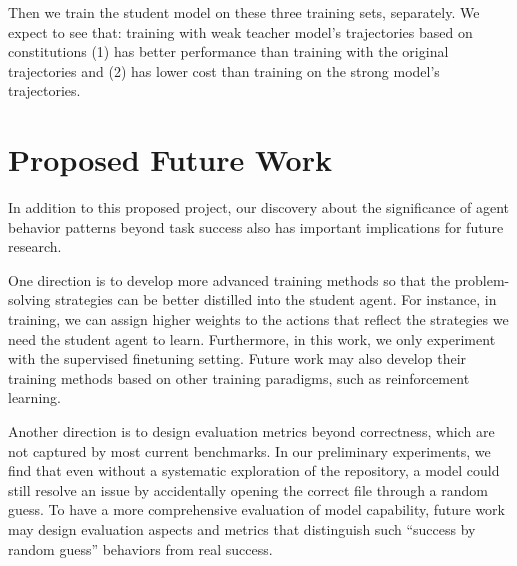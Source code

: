 Then we train the student model on these three training sets, separately. We expect to see that: training with weak teacher model's trajectories based on \plusname constitutions 
(1) has better performance than training with the original trajectories and 
(2) has lower cost than training on the strong model's trajectories.


\section{Proposed Future Work}
In addition to this proposed project, our discovery about the significance of agent behavior patterns beyond task success also has important implications for future research.

One direction is to develop more advanced training methods so that the problem-solving strategies can be better distilled into the student agent.
For instance, in training, we can assign higher weights to the actions that reflect the strategies we need the student agent to learn.
Furthermore, in this work, we only experiment with the supervised finetuning setting. Future work may also develop their training methods based on other training paradigms, such as reinforcement learning.

Another direction is to design evaluation metrics beyond correctness, which are not captured by most current benchmarks. 
In our preliminary experiments, we find that even without a systematic exploration of the repository, a model could still resolve an issue by accidentally opening the correct file through a random guess. 
To have a more comprehensive evaluation of model capability, future work may design evaluation aspects and metrics that distinguish such ``success by random guess'' behaviors from real success.